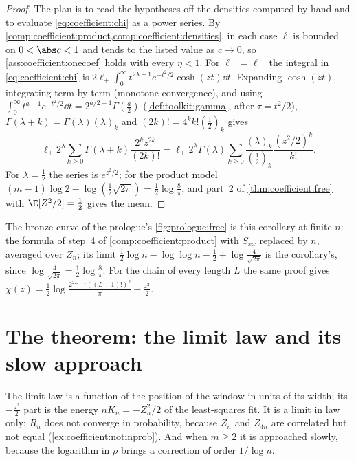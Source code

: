 \begin{refsection}
\begin{proof}
The plan is to read the hypotheses off the densities computed by hand and to evaluate \eqref{eq:coefficient:chi} as a power series. By \cref{comp:coefficient:product,comp:coefficient:densities}, in each case $\ell$ is bounded on $0<\abs c<1$ and tends to the listed value as $c\to0$, so \cref{ass:coefficient:onecoef} holds with every $\eta<1$. For $\ell_+=\ell_-$ the integral in \eqref{eq:coefficient:chi} is $2\ell_+\int_0^\infty t^{2\lambda-1}e^{-t^2/2}\cosh(zt)\dd t$. Expanding $\cosh(zt)$, integrating term by term (monotone convergence), and using $\int_0^\infty t^{a-1}e^{-t^2/2}\dd t=2^{a/2-1}\Gamma(\frac a2)$ (\cref{def:toolkit:gamma}, after $\tau=t^2/2$), $\Gamma(\lambda+k)=\Gamma(\lambda)(\lambda)_k$ and $(2k)!=4^kk!(\frac12)_k$ gives
\[
\ell_+2^\lambda\sum_{k\ge0}\Gamma(\lambda+k)\frac{2^kz^{2k}}{(2k)!}=\ell_+2^\lambda\Gamma(\lambda)\sum_{k\ge0}\frac{(\lambda)_k}{(\frac12)_k}\frac{(z^2/2)^k}{k!}.
\]
For $\lambda=\frac12$ the series is $e^{z^2/2}$; for the product model $(m-1)\log2-\log(\frac12\sqrt{2\pi})=\frac12\log\frac8\pi$, and part~2 of \cref{thm:coefficient:free} with $\E[Z^2/2]=\frac12$ gives the mean.
\end{proof}

The bronze curve of the prologue's \cref{fig:prologue:free} is this corollary at finite $n$: the formula of step~4 of \cref{comp:coefficient:product} with $S_{xx}$ replaced by $n$, averaged over $Z_n$; its limit $\frac12\log n-\log\log n-\frac12+\log\frac4{\sqrt{2\pi}}$ is the corollary's, since $\log\frac4{\sqrt{2\pi}}=\frac12\log\frac8\pi$. For the chain of every length $L$ the same proof gives $\chi(z)=\frac12\log\frac{2^{2L-1}((L-1)!)^2}\pi-\frac{z^2}2$.

\section{The theorem: the limit law and its slow approach}\label{sec:coefficient:limit}

The limit law is a function of the position of the window in units of its width; its $-\frac{z^2}2$ part is the energy $nK_n=-Z_n^2/2$ of the least-squares fit. It is a limit in law only: $R_n$ does not converge in probability, because $Z_n$ and $Z_{4n}$ are correlated but not equal (\cref{ex:coefficient:notinprob}). And when $m\ge2$ it is approached slowly, because the logarithm in $\rho$ brings a correction of order $1/\log n$.


\end{refsection}
